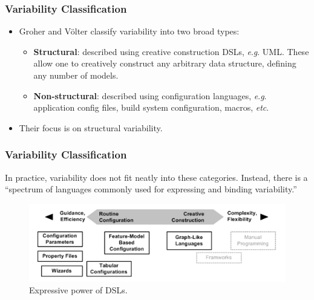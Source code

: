 \documentclass{beamer}
\newcommand{\eg}{\textit{e}.\textit{g}. }
\newcommand{\etc}{\textit{etc}. }
\begin{document}
\begin{frame}
\frametitle{Variability Classification}

\begin{itemize}

\item Groher and V{\"o}lter classify variability into two broad
  types\cite{groher2007expressing}:

\pause{}

\begin{itemize}
\item \textbf{Structural}: described using creative construction DSLs,
  \eg{} \ac{UML}. These allow one to creatively construct any arbitrary
  data structure, defining any number of models.

\pause{}

\item \textbf{Non-structural}: described using configuration
  languages, \eg{} application config files, build system configuration,
  macros, \etc{}

\pause{}

\end{itemize}

\item Their focus is on structural variability.

\end{itemize}

\end{frame}

\begin{frame}
\frametitle{Variability Classification}

In practice, variability does not fit neatly into these
categories. Instead, there is a \enquote{spectrum of languages
  commonly used for expressing and binding
  variability.}\cite{groher2007expressing}

\begin{figure}
  \centering
  \includegraphics[scale=0.6]{images/variability_spectrum_voelter.png}
  \caption{Expressive power of \ac{DSL}s.\cite{groher2007expressing}}
\end{figure}

\end{frame}
\end{document}
